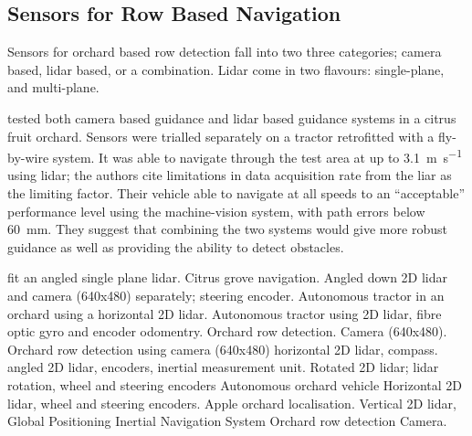 \documentclass[preprint,authoryear,12pt]{elsarticle}
\begin{document}
    \subsection{Sensors for Row Based Navigation}

        Sensors for orchard based row detection fall into two three categories; camera based, lidar based, or a combination.
        Lidar come in two flavours: single-plane, and multi-plane.

        \cite{Subramanian2006} tested both camera based guidance and lidar based guidance systems in a citrus fruit orchard.
        Sensors were trialled separately on a tractor retrofitted with a fly-by-wire system.
        It was able to navigate through the test area at up to \SI{3.1}{\meter\per\second} using lidar; the authors cite limitations in data acquisition rate from the liar as the limiting factor.
        Their vehicle able to navigate at all speeds to an ``acceptable'' performance level using the machine-vision system, with path errors below \SI{60}{\milli\meter}.
        They suggest that combining the two systems would give more robust guidance as well as providing the ability to detect obstacles.





        \cite{Subramanian2006} fit an angled single plane lidar. Citrus grove navigation. Angled down 2D lidar and camera (640x480) separately; steering encoder.
        \cite{Barawid2007} Autonomous tractor in an orchard using a horizontal 2D lidar.
        \cite{Hansen2011} Autonomous tractor using 2D lidar, fibre optic gyro and encoder odomentry.
        \cite{He2011} Orchard row detection. Camera (640x480).
        \cite{s110404086} Orchard row detection using camera (640x480)
        \cite{Scarfe2012} horizontal 2D lidar, compass.
        \cite{Freitas2012} angled 2D lidar, encoders, inertial measurement unit.
        \cite{Zhang2014} Rotated 2D lidar; lidar rotation, wheel and steering encoders
        \cite{Bergerman2015} Autonomous orchard vehicle Horizontal 2D lidar, wheel and steering encoders.
        \cite{Bargoti2015} Apple orchard localisation. Vertical 2D lidar, Global Positioning Inertial Navigation System
        \cite{Sharifi2015} Orchard row detection Camera.

\end{document}
